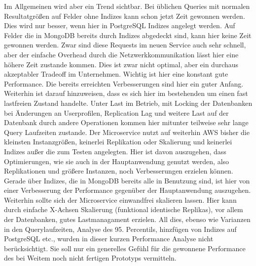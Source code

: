 Im Allgemeinen wird aber ein Trend sichtbar. Bei üblichen Queries mit normalen Resultatgrößen auf Felder ohne Indizes kann schon jetzt Zeit gewonnen werden. Dies wird nur besser, wenn hier in PostgreSQL Indizes angelegt werden. 
Auf Felder die in MongoDB bereits durch Indizes abgedeckt sind, kann hier keine Zeit gewonnen werden. Zwar sind diese Requests im neuen Service auch sehr schnell, aber der einfache Overhead durch die Netzwerkkommunikation lässt hier eine höhere Zeit zustande kommen.
Dies ist zwar nicht optimal, aber ein durchaus akzeptabler Tradeoff im Unternehmen. Wichtig ist hier eine konstant gute Performance. Die bereits erreichten Verbesserungen sind hier ein guter Anfang.
Weiterhin ist darauf hinzuweisen, dass es sich hier im bestehenden um einen fast lastfreien Zustand handelte. Unter Last im Betrieb, mit Locking der Datenbanken bei Änderungen an Userprofilen, Replication Lag und weitere Last auf der Datenbank durch andere Operationen kommen hier mitunter teilweise sehr lange Query Laufzeiten zustande. 
Der Microservice nutzt auf weiterhin AWS bisher die kleinsten Instanzgrößen, keinerlei Replikation oder Skalierung und keinerlei Indizes außer die zum Testen angelegten. 
Hier ist davon auszugehen, dass Optimierungen, wie sie auch in der Hauptanwendung genutzt werden, also Replikationen und größere Instanzen, noch Verbesserungen erzielen können. Gerade über Indizes, die in MongoDB bereits alle in Benutzung sind, ist hier von einer Verbesserung der Performance gegenüber der Hauptanwendung auszugehen. Weiterhin sollte sich der Microservice einwandfrei skalieren lassen. Hier kann durch einfache X-Achsen Skalierung (funktional identische Replikas), vor allem der Datenbanken, gutes Lastmanagament erzielen.
All dies, ebenso wie Varianzen in den Querylaufzeiten, Analyse des 95. Percentils, hinzfügen von Indizes auf PostgreSQL etc., wurden in dieser kurzen Performance Analyse nicht berücksichtigt. Sie soll nur ein generelles Gefühl für die gewonnene Performance des bei Weitem noch nicht fertigen Prototyps vermitteln.